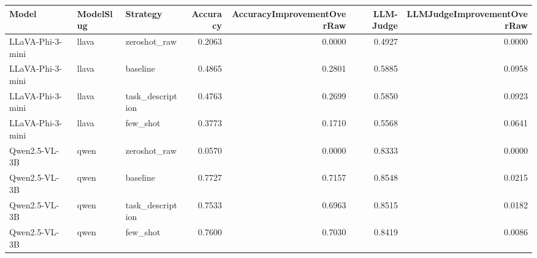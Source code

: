 \begin{tabular}{lllrrrr}
\toprule
Model & ModelSlug & Strategy & Accuracy & AccuracyImprovementOverRaw & LLM-Judge & LLMJudgeImprovementOverRaw \\
\midrule
LLaVA-Phi-3-mini & llava & zeroshot_raw & 0.2063 & 0.0000 & 0.4927 & 0.0000 \\
LLaVA-Phi-3-mini & llava & baseline & 0.4865 & 0.2801 & 0.5885 & 0.0958 \\
LLaVA-Phi-3-mini & llava & task_description & 0.4763 & 0.2699 & 0.5850 & 0.0923 \\
LLaVA-Phi-3-mini & llava & few_shot & 0.3773 & 0.1710 & 0.5568 & 0.0641 \\
Qwen2.5-VL-3B & qwen & zeroshot_raw & 0.0570 & 0.0000 & 0.8333 & 0.0000 \\
Qwen2.5-VL-3B & qwen & baseline & 0.7727 & 0.7157 & 0.8548 & 0.0215 \\
Qwen2.5-VL-3B & qwen & task_description & 0.7533 & 0.6963 & 0.8515 & 0.0182 \\
Qwen2.5-VL-3B & qwen & few_shot & 0.7600 & 0.7030 & 0.8419 & 0.0086 \\
\bottomrule
\end{tabular}
